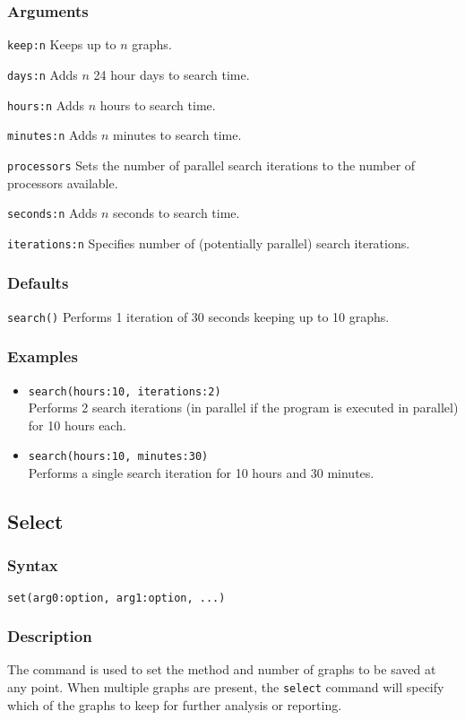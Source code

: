 \documentclass[11pt]{article}
\begin{document}
		\subsubsection{Arguments}
		\noindent \texttt{keep:n} Keeps up to $n$ graphs.
		
		\smallskip		
		\noindent \texttt{days:n} Adds $n$ 24 hour days to search time.
		
		\smallskip		
		\noindent \texttt{hours:n} Adds $n$ hours to search time.
		
		\smallskip		
		\noindent \texttt{minutes:n} Adds $n$ minutes to search time.
		
		\smallskip		
		\noindent \texttt{processors} Sets the number of parallel search iterations to the number of processors available.
		
		\smallskip		
		\noindent \texttt{seconds:n} Adds $n$ seconds to search time.
		
		\smallskip		
		\noindent \texttt{iterations:n} Specifies number of (potentially parallel) search iterations.
		
		\subsubsection{Defaults}
		\texttt{search()} Performs 1 iteration of 30 seconds keeping up to 10 graphs.
		\subsubsection{Examples}
		\begin{itemize}
			\item{\texttt{search(hours:10, iterations:2)}\\ Performs 2 search iterations (in parallel if the program is executed in parallel) for 10 hours each.}
			\item{\texttt{search(hours:10, minutes:30)}\\ Performs a single search iteration for 10 hours and 30 minutes.}
		\end{itemize}
	
	
	\subsection{Select}
		\subsubsection{Syntax}
			\texttt{set(arg0:option, arg1:option, ...)}
		\subsubsection{Description}
			The command is used to set the method and number of graphs to be saved at any point.
			When multiple graphs are present, the \texttt{select} command will specify which of the graphs to
			keep for further analysis or reporting.
\end{document}
